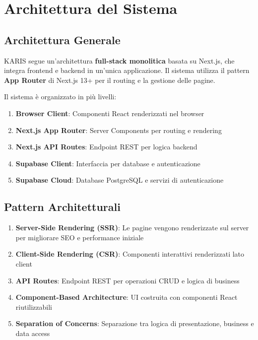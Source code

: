 \documentclass{article}
\begin{document}
\section{Architettura del Sistema}

\subsection{Architettura Generale}

KARIS segue un'architettura \textbf{full-stack monolitica} basata su Next.js, che integra frontend e backend in un'unica applicazione. Il sistema utilizza il pattern \textbf{App Router} di Next.js 13+ per il routing e la gestione delle pagine.

Il sistema è organizzato in più livelli:

\begin{enumerate}[leftmargin=*]
\item \textbf{Browser Client}: Componenti React renderizzati nel browser
\item \textbf{Next.js App Router}: Server Components per routing e rendering
\item \textbf{Next.js API Routes}: Endpoint REST per logica backend
\item \textbf{Supabase Client}: Interfaccia per database e autenticazione
\item \textbf{Supabase Cloud}: Database PostgreSQL e servizi di autenticazione
\end{enumerate}

\subsection{Pattern Architetturali}

\begin{enumerate}[leftmargin=*]
\item \textbf{Server-Side Rendering (SSR)}: Le pagine vengono renderizzate sul server per migliorare SEO e performance iniziale
\item \textbf{Client-Side Rendering (CSR)}: Componenti interattivi renderizzati lato client
\item \textbf{API Routes}: Endpoint REST per operazioni CRUD e logica di business
\item \textbf{Component-Based Architecture}: UI costruita con componenti React riutilizzabili
\item \textbf{Separation of Concerns}: Separazione tra logica di presentazione, business e data access
\end{enumerate}
\end{document}
